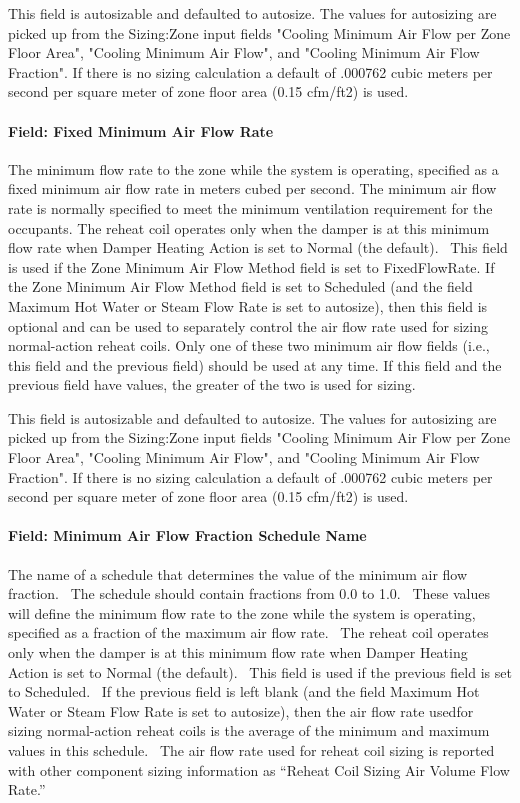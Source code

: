 This field is autosizable and defaulted to autosize. The values for autosizing are picked up from the Sizing:Zone input fields "Cooling Minimum Air Flow per Zone Floor Area", "Cooling Minimum Air Flow", and "Cooling Minimum Air Flow Fraction". If there is no sizing calculation a default of .000762 cubic meters per second per square meter of zone floor area (0.15 cfm/ft2) is used.

\paragraph{Field: Fixed Minimum Air Flow Rate}\label{field-fixed-minimum-air-flow-rate}

The minimum flow rate to the zone while the system is operating, specified as a fixed minimum air flow rate in meters cubed per second. The minimum air flow rate is normally specified to meet the minimum ventilation requirement for the occupants. The reheat coil operates only when the damper is at this minimum flow rate when Damper Heating Action is set to Normal (the default).~ This field is used if the Zone Minimum Air Flow Method field is set to FixedFlowRate. If the Zone Minimum Air Flow Method field is set to Scheduled (and the field Maximum Hot Water or Steam Flow Rate is set to autosize), then this field is optional and can be used to separately control the air flow rate used for sizing normal-action reheat coils. Only one of these two minimum air flow fields (i.e., this field and the previous field) should be used at any time. If this field and the previous field have values, the greater of the two is used for sizing.

This field is autosizable and defaulted to autosize. The values for autosizing are picked up from the Sizing:Zone input fields "Cooling Minimum Air Flow per Zone Floor Area", "Cooling Minimum Air Flow", and "Cooling Minimum Air Flow Fraction". If there is no sizing calculation a default of .000762 cubic meters per second per square meter of zone floor area (0.15 cfm/ft2) is used.

\paragraph{Field: Minimum Air Flow Fraction Schedule Name}\label{field-minimum-air-flow-fraction-schedule-name}

The name of a schedule that determines the value of the minimum air flow fraction.~ The schedule should contain fractions from 0.0 to 1.0.~ These values will define the minimum flow rate to the zone while the system is operating, specified as a fraction of the maximum air flow rate.~ The reheat coil operates only when the damper is at this minimum flow rate when Damper Heating Action is set to Normal (the default).~ This field is used if the previous field is set to Scheduled.~ If the previous field is left blank (and the field Maximum Hot Water or Steam Flow Rate is set to autosize), then the air flow rate usedfor sizing normal-action reheat coils is the average of the minimum and maximum values in this schedule.~ The air flow rate used for reheat coil sizing is reported with other component sizing information as ``Reheat Coil Sizing Air Volume Flow Rate.''

